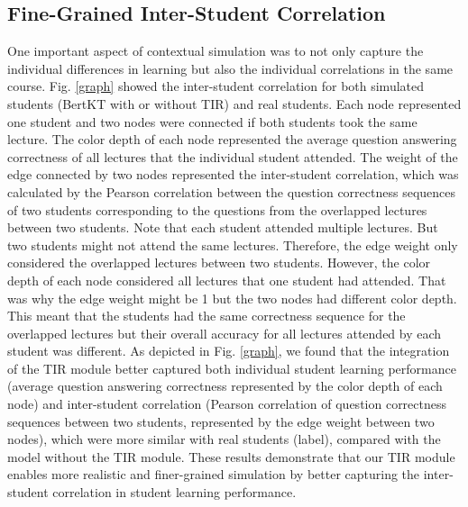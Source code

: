 \subsection{Fine-Grained Inter-Student Correlation}
One important aspect of contextual simulation was to not only capture the individual differences in learning but also the individual correlations in the same course. Fig. \ref{graph} showed the inter-student correlation for both simulated students (BertKT with or without TIR) and real students. Each node represented one student and two nodes were connected if both students took the same lecture. The color depth of each node represented the average question answering correctness of all lectures that the individual student attended. The weight of the edge connected by two nodes represented the inter-student correlation, which was calculated by the Pearson correlation between the question correctness sequences of two students corresponding to the questions from the overlapped lectures between two students. Note that each student attended multiple lectures. But two students might not attend the same lectures. Therefore, the edge weight only considered the overlapped lectures between two students. However, the color depth of each node considered all lectures that one student had attended. That was why the edge weight might be 1 but the two nodes had different color depth. This meant that the students had the same correctness sequence for the overlapped lectures but their overall accuracy for all lectures attended by each student was different.
%  
As depicted in Fig. \ref{graph}, we found that the integration of the TIR module better captured both individual student learning performance (average question answering correctness represented by the color depth of each node) and inter-student correlation (Pearson correlation of question correctness sequences between two students, represented by the edge weight between two nodes), which were more similar with real students (label), compared with the model without the TIR module.
These results demonstrate that our TIR module enables more realistic and finer-grained simulation by better capturing the inter-student correlation in student learning performance.





